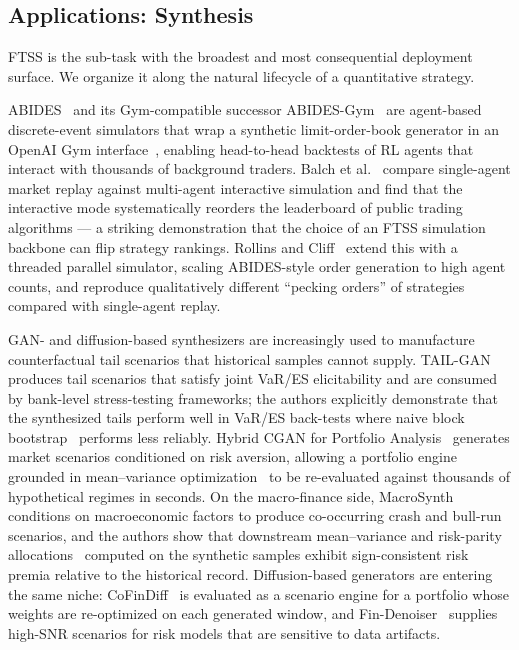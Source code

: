 \documentclass[11pt,a4paper]{article}
\begin{document}
\subsection{Applications: Synthesis}

FTSS is the sub-task with the broadest and most consequential deployment
surface. We organize it along the natural lifecycle of a quantitative
strategy.

ABIDES~\citep{byrd2019abides} and its Gym-compatible successor
ABIDES-Gym~\citep{amrouni2021abides} are agent-based discrete-event
simulators that wrap a synthetic limit-order-book generator in an
OpenAI Gym interface~\citep{brockman2016openai}, enabling head-to-head backtests of RL agents that
interact with thousands of background traders.
Balch et al.~\citep{balch2019how} compare single-agent market replay against
multi-agent interactive simulation and find that the interactive mode
systematically reorders the leaderboard of public trading algorithms
--- a striking demonstration that the choice of an FTSS simulation backbone can flip
strategy rankings. Rollins and Cliff~\citep{rollins2020which} extend this with a threaded
parallel simulator, scaling ABIDES-style order generation to high agent
counts, and reproduce qualitatively different ``pecking orders'' of
strategies compared with single-agent replay.

GAN- and diffusion-based synthesizers are increasingly used to
manufacture counterfactual tail scenarios that historical
samples cannot supply. TAIL-GAN~\citep{cont2025tailgan} produces tail
scenarios that satisfy joint VaR/ES elicitability and are consumed by
bank-level stress-testing frameworks; the authors explicitly demonstrate
that the synthesized tails perform well in VaR/ES back-tests where naive
block bootstrap~\citep{politis1994stationary} performs less reliably. Hybrid CGAN for Portfolio
Analysis~\citep{lu2022hybrid} generates market scenarios conditioned on
risk aversion, allowing a portfolio engine grounded in mean--variance optimization~\citep{markowitz1952portfolio} to be re-evaluated against
thousands of hypothetical regimes in seconds. On the macro-finance
side, MacroSynth~\citep{alex2024macroeconomic} conditions on
macroeconomic factors to produce co-occurring crash and bull-run
scenarios, and the authors show that downstream mean--variance and
risk-parity allocations~\citep{maillard2010properties} computed on the synthetic samples exhibit
sign-consistent risk premia relative to the historical record.
Diffusion-based generators are entering the same niche:
CoFinDiff~\citep{tanaka2025cofindiff} is evaluated as a scenario engine
for a portfolio whose weights are re-optimized on each generated
window, and Fin-Denoiser~\citep{wang2024denoiser} supplies high-SNR
scenarios for risk models that are sensitive to data
artifacts.
\end{document}
